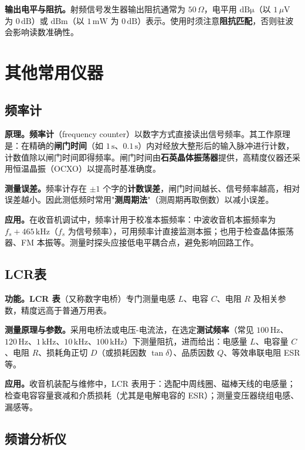 \documentclass[12pt,UTF8]{ctexbook}
\begin{document}
\textbf{输出电平与阻抗。}射频信号发生器输出阻抗通常为 $50\,\Omega$，电平用 $\mathrm{dB\mu}$（以 $1\,\mu\mathrm{V}$ 为 $0\,\mathrm{dB}$）或 $\mathrm{dBm}$（以 $1\,\mathrm{mW}$ 为 $0\,\mathrm{dB}$）表示。使用时须注意\textbf{阻抗匹配}，否则驻波会影响读数准确性。

\section{其他常用仪器}
\label{sec:other_instruments}

\subsection{频率计}

\textbf{原理。}\textbf{频率计}（frequency counter）以数字方式直接读出信号频率。其工作原理是：在精确的\textbf{闸门时间}（如 $1\,\mathrm{s}$、$0.1\,\mathrm{s}$）内对经放大整形后的输入脉冲进行计数，计数值除以闸门时间即得频率。闸门时间由\textbf{石英晶体振荡器}提供，高精度仪器还采用恒温晶振（OCXO）以提高时基准确度。

\textbf{测量误差。}频率计存在 $\pm 1$ 个字的\textbf{计数误差}，闸门时间越长、信号频率越高，相对误差越小。因此测低频时常用"\textbf{测周期法}"（测周期再取倒数）以减小误差。

\textbf{应用。}在收音机调试中，频率计用于校准本振频率：中波收音机本振频率为 $f_s+465\,\mathrm{kHz}$（$f_s$ 为信号频率），可用频率计直接监测本振；也用于检查晶体振荡器、FM 本振等。测量时探头应接低电平耦合点，避免影响回路工作。

\subsection{LCR表}

\textbf{功能。}\textbf{LCR 表}（又称数字电桥）专门测量电感 $L$、电容 $C$、电阻 $R$ 及相关参数，精度远高于普通万用表。

\textbf{测量原理与参数。}采用电桥法或电压-电流法，在选定\textbf{测试频率}（常见 $100\,\mathrm{Hz}$、$120\,\mathrm{Hz}$、$1\,\mathrm{kHz}$、$10\,\mathrm{kHz}$、$100\,\mathrm{kHz}$）下测量阻抗，进而给出：电感量 $L$、电容量 $C$、电阻 $R$、损耗角正切 $D$（或损耗因数 $\tan\delta$）、品质因数 $Q$、等效串联电阻 ESR 等。

\textbf{应用。}收音机装配与维修中，LCR 表用于：选配中周线圈、磁棒天线的电感量；检查电容容量衰减和介质损耗（尤其是电解电容的 ESR）；测量变压器绕组电感、漏感等。

\subsection{频谱分析仪}
\end{document}
